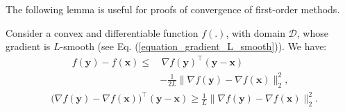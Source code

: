 \documentclass[lang=cn,10pt]{gorgeousnbook}
\numberwithin{equation}{section}%
\numberwithin{figure}{section}%
\begin{document}
The following lemma is useful for proofs of convergence of first-order methods. 
\begin{lemma}\label{lemma_function_and_gradient_difference_bounds}
Consider a convex and differentiable function $f(.)$, with domain $\mathcal{D}$, whose gradient is $L$-smooth (see Eq. (\ref{equation_gradient_L_smooth})). We have:
\begin{align}
f(\boldsymbol{y}) - f(\boldsymbol{x}) \leq &\,\nabla f(\boldsymbol{y})^\top (\boldsymbol{y} - \boldsymbol{x}) \nonumber \\
&- \frac{1}{2 L} \|\nabla f(\boldsymbol{y}) - \nabla f(\boldsymbol{x})\|_2^2, \label{equation_lemma_fy_fx_grady_y_x}
\end{align}
\begin{align}
& \big( \nabla f(\boldsymbol{y}) - \nabla f(\boldsymbol{x}) \big)^\top (\boldsymbol{y} - \boldsymbol{x}) \geq \frac{1}{L} \|\nabla f(\boldsymbol{y}) - \nabla f(\boldsymbol{x})\|_2^2. \label{equation_lemma_gradfy_gradfx_y_x}
\end{align}
\end{lemma}
\end{document}
